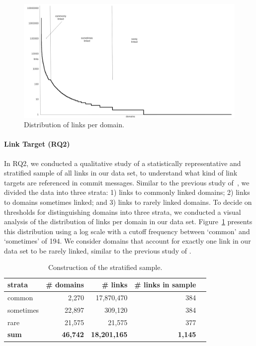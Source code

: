 \documentclass[smallextended]{svjour3}       %
\begin{document}
\begin{figure}[t]
  \centering
    \includegraphics[width=\textwidth]{figure1.jpg}
  \caption{Distribution of links per domain.}
  \label{fig:linkperdomain}
\end{figure}



\paragraph{Link Target (RQ2)}
In RQ2, we conducted a qualitative study of a statistically representative and stratified sample of all links in our data set, to understand what kind of link targets are referenced in commit messages. Similar to the previous study of~\cite{hata20199}, we divided the data into three strata: 1) links to commonly linked domains; 2) links to domains sometimes linked; and 3) links to rarely linked domains. To decide on thresholds for distinguishing domains into three strata, we conducted a visual analysis of the distribution of links per domain in our data set. Figure~\ref{fig:linkperdomain} presents this distribution using a log scale with a cutoff frequency between `common' and `sometimes' of 194. We consider domains that account for exactly one link in our data set to be rarely linked, similar to the previous study of \cite{hata20199}.

\begin{table}[t]
\centering
\caption{Construction of the stratified sample.}
\label{tab:sampling}
\begin{tabular}{lrrrr}
\toprule
\textbf{strata} & \textbf{\# domains} & \textbf{\# links} & \textbf{\# links in sample} \\
\midrule
common & 2,270 & 17,870,470 & 384 \\
sometimes & 22,897 & 309,120 & 384 \\
rare & 21,575 & 21,575 & 377 \\
\midrule
\textbf{sum} & \textbf{46,742} & \textbf{18,201,165} & \textbf{1,145} \\
\bottomrule
\end{tabular}
\end{table}
\end{document}

